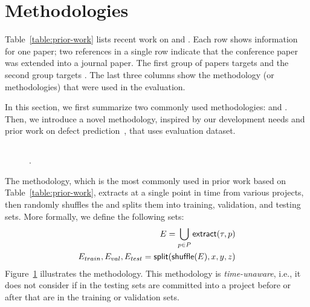 \section{Methodologies}
\label{sec:methodologies}



Table~\ref{table:prior-work} lists recent work on \comgen and
\methnam{}.  Each row shows information for one
paper; two references in a single row indicate that the conference
paper was extended into a journal paper.  The first group of papers
targets \comgen and the second group targets \methnam.  The last three
columns show the methodology (or methodologies) that were used in the
evaluation.

In this section, we first summarize two commonly used methodologies:
\mixedproj and \crossproj.  Then, we introduce a novel methodology,
inspired by our development needs and prior work on defect
prediction~\cite{TanETAL15Online}, that uses \evoaware evaluation
dataset.

\subsection{\Mixedproj}

\begin{figure}[t]
  \centering
  
  \caption{\Mixedproj \methodology. \label{fig:method-mixedproj}}
\end{figure}

The \emph{\mixedproj} methodology, which is the most commonly used in
prior work based on Table~\ref{table:prior-work}, extracts \examples
at a single point in time from various projects, then randomly
shuffles the \examples and splits them into training, validation, and
testing sets.  More formally, we define the following sets:
%
\begin{align*}
  E = \bigcup_{p \in P} \mathsf{extract}(\tau, p) \\
  E_{train}, E_{val}, E_{test} = \mathsf{split}(\mathsf{shuffle}(E), x, y, z)
\end{align*}
%
Figure~\ref{fig:method-mixedproj} illustrates the \mixedproj
methodology.
%
This methodology is \emph{time-unaware}, i.e., it does not consider if
\examples in the testing sets are committed into a project before or
after \examples that are in the training or validation sets.

